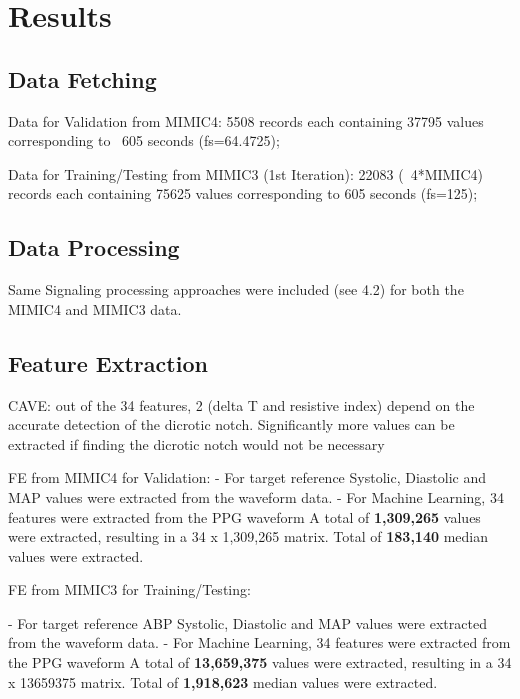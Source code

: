 \documentclass[12pt, bibliography=totoc]{scrartcl}
\begin{document}
    \section{Results}
    \label{sec:results}

    \subsection{Data Fetching}
    \label{subsec:data_fetching}

    Data for Validation from MIMIC4:
    5508 records each containing 37795 values corresponding to ~605 seconds (fs=64.4725);

    Data for Training/Testing from MIMIC3 (1st Iteration):
    22083 (~4*MIMIC4) records each containing 75625 values corresponding to 605 seconds (fs=125);

    \subsection{Data Processing}
    \label{subsec:data_processing}

    Same Signaling processing approaches were included (see 4.2) for both the MIMIC4 and MIMIC3 data.

    \subsection{Feature Extraction}
    \label{subsec:feature_extraction}

    CAVE: out of the 34 features, 2 (delta T and resistive index) depend on the accurate detection of the dicrotic notch.
    Significantly more values can be extracted if finding the dicrotic notch would not be necessary

    FE from MIMIC4 for Validation:
    - For target reference Systolic, Diastolic and MAP values were extracted from the waveform data.
    - For Machine Learning, 34 features were extracted from the PPG waveform
    A total of \textbf{1,309,265} values were extracted, resulting in a 34 x 1,309,265 matrix.
    Total of \textbf{183,140} median values were extracted.

    FE from MIMIC3 for Training/Testing:

    - For target reference ABP Systolic, Diastolic and MAP values were extracted from the waveform data.
    - For Machine Learning, 34 features were extracted from the PPG waveform
    A total of \textbf{13,659,375} values were extracted, resulting in a 34 x 13659375 matrix.
    Total of \textbf{1,918,623} median values were extracted.
\end{document}
